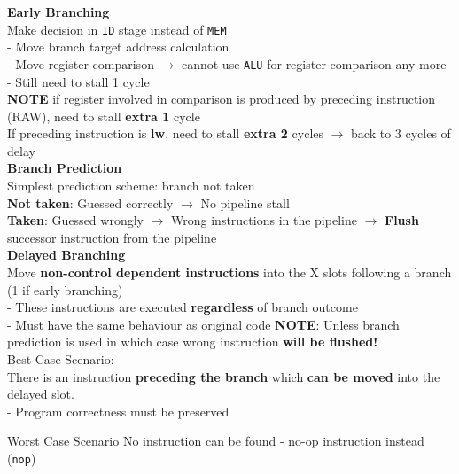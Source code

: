 \documentclass[10pt, a4paper]{article}
\newcommand{\highlight}[1]{{\color{red}\textbf{#1}}}
\begin{document}
\begin{multicols*}{3}
		\textbf{Early Branching}\\
		Make decision in \texttt{ID} stage instead of \texttt{MEM}\\
		- Move branch target address calculation\\
		- Move register comparison $\rightarrow$ cannot use \texttt{ALU} for register comparison any more\\
		- Still need to stall 1 cycle\\
		\highlight{NOTE} if register involved in comparison is produced by preceding instruction (RAW), need to stall \highlight{extra 1} cycle\\
		If preceding instruction is \highlight{lw}, need to stall \highlight{extra 2} cycles $\rightarrow$ back to 3 cycles of delay\\
		
		\textbf{Branch Prediction}\\
		Simplest prediction scheme: branch not taken\\
		\highlight{Not taken}: Guessed correctly $\rightarrow$ No pipeline stall\\
		\highlight{Taken}: Guessed wrongly $\rightarrow$ Wrong instructions in the pipeline $\rightarrow$ \textbf{Flush} successor instruction from the pipeline\\
		
		\textbf{Delayed Branching}\\
		Move \textbf{non-control dependent instructions} into the X slots following a branch (1 if early branching)\\
		- These instructions are executed \textbf{regardless} of branch outcome\\
		- Must have the same behaviour as original code
		\highlight{NOTE}: Unless branch prediction is used in which case wrong instruction \textbf{will be flushed!}\\
		
		Best Case Scenario:\\
		There is an instruction \textbf{preceding the branch} which \textbf{can be moved} into the delayed slot.\\
		- Program correctness must be preserved
		
		Worst Case Scenario
		No instruction can be found
		- no-op instruction instead (\texttt{nop})\\
		
		
		
		
		
		
		
				
		
		
		
		
		
		
		
				
	\end{multicols*}
\end{document}

